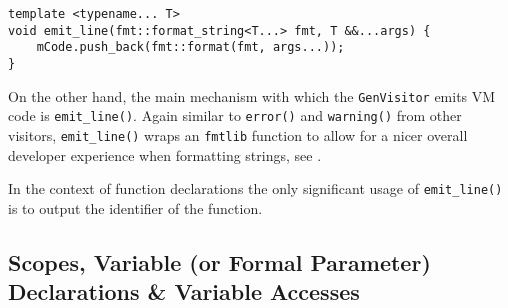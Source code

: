 \begin{lstlisting}[caption={The \texttt{emit\_line()} method in
the \texttt{GenVisitor} class (ir\_gen/GenVisitor.cpp)},
label=lst:emitline]
template <typename... T>
void emit_line(fmt::format_string<T...> fmt, T &&...args) {
    mCode.push_back(fmt::format(fmt, args...));
}
\end{lstlisting}

On the other hand, the main mechanism with which the
\texttt{GenVisitor} emits VM code is \texttt{emit\_line()}.
Again similar to \texttt{error()} and \texttt{warning()} from
other visitors, \texttt{emit\_line()} wraps an \texttt{fmtlib}
function to allow for a nicer overall developer experience when
formatting strings, see .

In the context of function declarations the only significant
usage of \texttt{emit\_line()} is to output the identifier of
the function.

\subsection{Scopes, Variable (or Formal Parameter) Declarations
\& Variable Accesses}

